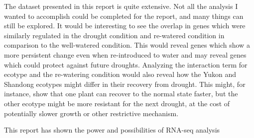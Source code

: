 \documentclass[12pt]{article}
\begin{document}
	The dataset presented in this report is quite extensive. Not all the analysis I wanted to accomplish could be completed for the report, and many things can still be explored. It would be interesting to see the overlap in genes which were similarly regulated in the drought condition and re-watered condition in comparison to the well-watered condition. This would reveal genes which show a more persistent change even when re-introduced to water and may reveal genes which could protect against future droughts. Analyzing the interaction term for ecotype and the re-watering condition would also reveal how the Yukon and Shandong ecotypes might differ in their recovery from drought. This might, for instance, show that one plant can recover to the normal state faster, but the other ecotype might be more resistant for the next drought, at the cost of potentially slower growth or other restrictive mechanism.
	
	This report has shown the power and possibilities of RNA-seq analysis
\clearpage


\end{document}
